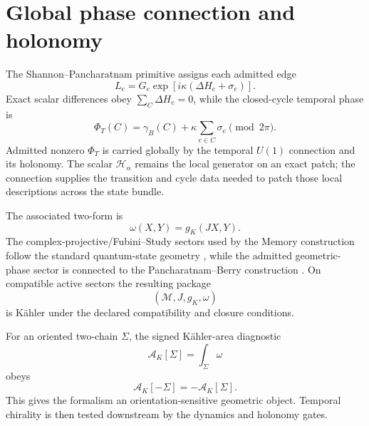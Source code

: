 \section{Global phase connection and holonomy}
The Shannon--Pancharatnam primitive assigns each admitted edge
\[
L_e=G_e\exp\!\left[i\kappa(\Delta H_e+\sigma_e)\right].
\]
Exact scalar differences obey \(\sum_C\Delta H_e=0\), while the closed-cycle temporal phase is
\[
\boxed{
\Phi_T(C)=\gamma_B(C)+\kappa\sum_{e\in C}\sigma_e\pmod{2\pi}.
}
\]
Admitted nonzero \(\Phi_T\) is carried globally by the temporal \(U(1)\) connection and its holonomy. The scalar \(\mathcal H_\alpha\) remains the local generator on an exact patch; the connection supplies the transition and cycle data needed to patch those local descriptions across the state bundle.

The associated two-form is
\[
\omega(X,Y)=g_K(JX,Y).
\]
The complex-projective/Fubini--Study sectors used by the Memory construction follow the standard quantum-state geometry \cite{ProvostVallee1980}, while the admitted geometric-phase sector is connected to the Pancharatnam--Berry construction \cite{Pancharatnam1956,Berry1984}. On compatible active sectors the resulting package
\[
\boxed{(\mathcal M,J,g_K,\omega)}
\]
is Kähler under the declared compatibility and closure conditions.

For an oriented two-chain \(\Sigma\), the signed Kähler-area diagnostic
\[
\mathcal A_K[\Sigma]=\int_\Sigma\omega
\]
obeys
\[
\mathcal A_K[-\Sigma]=-\mathcal A_K[\Sigma].
\]
This gives the formalism an orientation-sensitive geometric object. Temporal chirality is then tested downstream by the dynamics and holonomy gates.

